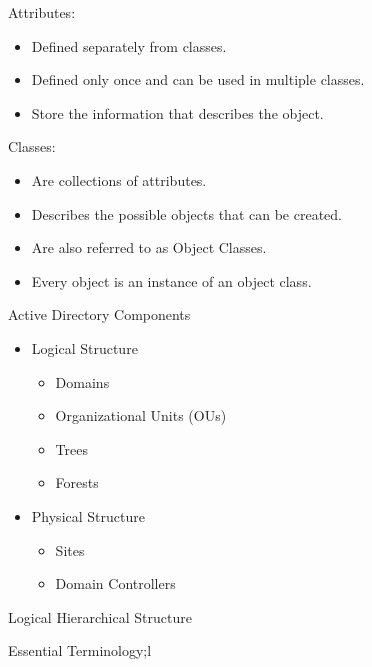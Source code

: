 Attributes:

\begin{itemize}
    \item Defined separately from classes.
    \item Defined only once and can be used in multiple classes.
    \item Store the information that describes the object.
\end{itemize}
Classes:

\begin{itemize}
    \item Are collections of attributes.
    \item Describes the possible objects that can be created.
    \item Are also referred to as Object Classes.
    \item Every object is an instance of an object class.
\end{itemize}

Active Directory Components

\begin{itemize}
    \item Logical Structure
    \begin{itemize}
        \item Domains
        \item Organizational Units (OUs)
        \item Trees
        \item Forests
    \end{itemize}
    \item Physical Structure
    \begin{itemize}
        \item Sites
        \item Domain Controllers
    \end{itemize}
\end{itemize}

Logical Hierarchical Structure

Essential Terminology;l

